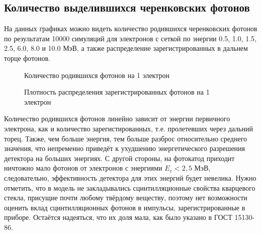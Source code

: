 \documentclass[12pt,a4paper]{report} %
\begin{document}
\subsection{Количество выделившихся черенковских фотонов}
На данных графиках можно видеть количество родившихся черенковских фотонов по результатам 10000 симуляций для электронов с сеткой по энергии 0.5, 1.0, 1.5, 2.5, 6.0, 8.0 и 10.0 МэВ, а также распределение зарегистрированных в дальнем торце фотонов. 
\begin{figure}[bh]
\caption{Количество родившихся фотонов на 1 электрон}
\label{Cercount}
\caption{Плотность распределения зарегистрированных фотонов на 1 электрон}
\end{figure}
Количество родившихся фотонов линейно зависит от энергии первичного электрона, как и количество зарегистированных, т.е. пролетевших через дальний торец. Также, чем больше энергия, тем больше разброс относительно среднего значения, что непременно приведёт к ухудшению энергетического разрешения детектора на больших энергиях. С другой стороны, на фотокатод приходит ничтожно мало фотонов от электронов с энергиями $E_e<2,5$ МэВ, следовательно, эффективность детектора для этих энергий будет невелика. Нужно отметить, что в модель не закладывались сцинтилляционные свойства кварцевого стекла, присущие почти любому твёрдому веществу, поэтому нет возможности оценить вклад сцинтилляционных фотонов в импульсы, зарегистрированные в приборе. Остаётся надеяться, что их доля мала, как было указано в ГОСТ 15130-86.
\end{document}
